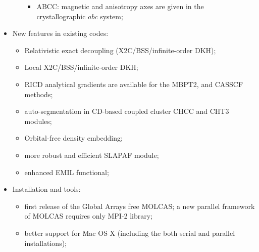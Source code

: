 \begin{itemize}
\begin{itemize}
\begin{itemize}
       \item ABCC: magnetic and anisotropy axes are given in the crystallographic $abc$ system;
    \end{itemize}
\end{itemize}
\item New features in existing codes:
\begin{itemize}
\item Relativistic exact decoupling (X2C/BSS/infinite-order DKH);
\item Local X2C/BSS/infinite-order DKH;
\item RICD analytical gradients are available for the MBPT2, and CASSCF methods;
\item auto-segmentation in CD-based coupled cluster CHCC and CHT3 modules;
\item Orbital-free density embedding;
\item more robust and efficient SLAPAF module;
\item enhanced EMIL functional;
\end{itemize}
\item Installation and tools:
\begin{itemize}
\item first release of the Global Arrays free MOLCAS; a new parallel framework of MOLCAS requires only MPI-2 library;
\item better support for Mac OS X (including the both serial and parallel installations);
\end{itemize}
\end{itemize}

